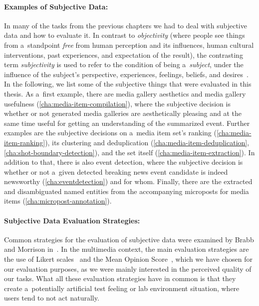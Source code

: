 \paragraph{Examples of Subjective Data:}

In many of the tasks from the previous chapters
we had to deal with subjective data and how to evaluate it.
In contrast to \emph{objectivity} (where people see things
from a~standpoint \emph{free} from human perception and its influences,
human cultural interventions, past experiences,
and expectation of the result),
the contrasting term \emph{subjectivity} is used to refer to the condition
of being a~\emph{subject}, under the influence of the subject's perspective, experiences,
feelings, beliefs, and desires~\cite{honderich2005oxford}.
In the following, we list some of the subjective things
that were evaluated in this thesis.
As a~first example, there are media gallery aesthetics and media gallery usefulness
(\autoref{cha:media-item-compilation}),
where the subjective decision is whether
or not generated media galleries are aesthetically pleasing 
and at the same time useful for getting an understanding
of the summarized event.
Further examples are the subjective decisions on a~media item set's
ranking (\autoref{cha:media-item-ranking}),
its clustering and deduplication (\autoref{cha:media-item-deduplication}, \autoref{cha:shot-boundary-detection}),
and the set itself (\autoref{cha:media-item-extraction}).
In addition to that, there is also event detection,
where the subjective decision is whether or not a~given detected breaking news event candidate is indeed newsworthy (\autoref{cha:eventdetection}) and for whom.
Finally, there are the extracted and disambiguated named entities
from the accompanying microposts for media items
(\autoref{cha:micropost-annotation}).

\paragraph{Subjective Data Evaluation Strategies:}

Common strategies for the evaluation of subjective data were 
examined by Brabb and Morrison in~\cite{brabb1964evaluation}.
In the multimedia context, the main evaluation strategies are
the use of Likert scales~\cite{likert1932likertscale} 
and the Mean Opinion Score~\cite{itu1998mos},
which we have chosen for our evaluation purposes,
as we were mainly interested in the perceived quality of our tasks.
What all these evaluation strategies have in common is
that they create a~potentially artificial test feeling
or lab environment situation, where users tend to not act naturally.

